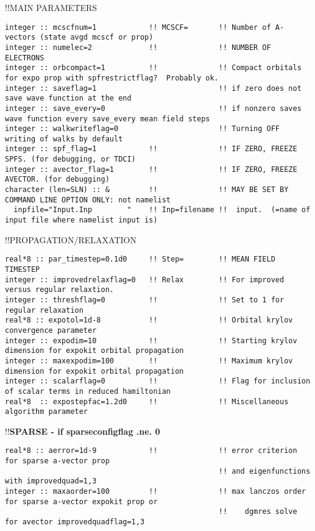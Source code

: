 !!{\large \quad MAIN PARAMETERS }
\begin{verbatim}
integer :: mcscfnum=1            !! MCSCF=       !! Number of A-vectors (state avgd mcscf or prop)
integer :: numelec=2             !!              !! NUMBER OF ELECTRONS
integer :: orbcompact=1          !!              !! Compact orbitals for expo prop with spfrestrictflag?  Probably ok.
integer :: saveflag=1                            !! if zero does not save wave function at the end
integer :: save_every=0                          !! if nonzero saves wave function every save_every mean field steps
integer :: walkwriteflag=0                       !! Turning OFF writing of walks by default
integer :: spf_flag=1            !!              !! IF ZERO, FREEZE SPFS. (for debugging, or TDCI)
integer :: avector_flag=1        !!              !! IF ZERO, FREEZE AVECTOR. (for debugging)
character (len=SLN) :: &         !!              !! MAY BE SET BY COMMAND LINE OPTION ONLY: not namelist
  inpfile="Input.Inp        "    !! Inp=filename !!  input.  (=name of input file where namelist input is)
\end{verbatim}
!!{\large \quad PROPAGATION/RELAXATION}
\begin{verbatim}
real*8 :: par_timestep=0.1d0     !! Step=        !! MEAN FIELD TIMESTEP
integer :: improvedrelaxflag=0   !! Relax        !! For improved versus regular relaxtion.   
integer :: threshflag=0          !!              !! Set to 1 for regular relaxation
real*8 :: expotol=1d-8           !!              !! Orbital krylov convergence parameter
integer :: expodim=10            !!              !! Starting krylov dimension for expokit orbital propagation
integer :: maxexpodim=100        !!              !! Maximum krylov dimension for expokit orbital propagation
integer :: scalarflag=0          !!              !! Flag for inclusion of scalar terms in reduced hamiltonian
real*8  :: expostepfac=1.2d0     !!              !! Miscellaneous algorithm parameter
\end{verbatim}
!!\textbf{\qquad SPARSE - if sparseconfigflag .ne. 0}
\begin{verbatim}
real*8 :: aerror=1d-9            !!              !! error criterion for sparse a-vector prop
                                                 !! and eigenfunctions with improvedquad=1,3
integer :: maxaorder=100         !!              !! max lanczos order for sparse a-vector expokit prop or
                                                 !!    dgmres solve for avector improvedquadflag=1,3
\end{verbatim}
